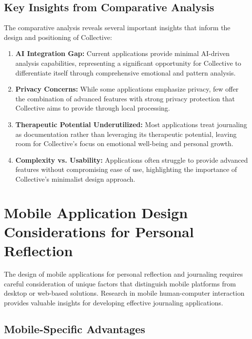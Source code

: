 \subsection{Key Insights from Comparative Analysis}\label{subsec:insights}

The comparative analysis reveals several important insights that inform the design and positioning of Collective:

\begin{enumerate}
    \item \textbf{AI Integration Gap:} Current applications provide minimal AI-driven analysis capabilities, representing a significant opportunity for Collective to differentiate itself through comprehensive emotional and pattern analysis.
    
    \item \textbf{Privacy Concerns:} While some applications emphasize privacy, few offer the combination of advanced features with strong privacy protection that Collective aims to provide through local processing.
    
    \item \textbf{Therapeutic Potential Underutilized:} Most applications treat journaling as documentation rather than leveraging its therapeutic potential, leaving room for Collective's focus on emotional well-being and personal growth.
    
    \item \textbf{Complexity vs. Usability:} Applications often struggle to provide advanced features without compromising ease of use, highlighting the importance of Collective's minimalist design approach.
\end{enumerate}

\section{Mobile Application Design Considerations for Personal Reflection}\label{sec:mobile-design}

The design of mobile applications for personal reflection and journaling requires careful consideration of unique factors that distinguish mobile platforms from desktop or web-based solutions. Research in mobile human-computer interaction provides valuable insights for developing effective journaling applications.

\subsection{Mobile-Specific Advantages}\label{subsec:mobile-advantages}

